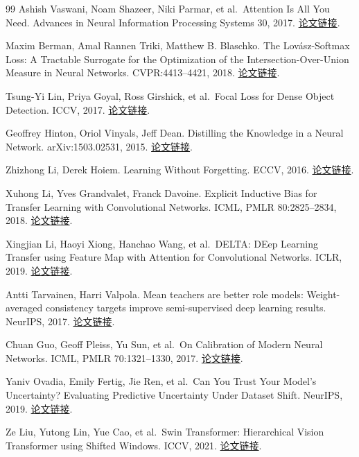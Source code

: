\documentclass[UTF8,a4paper,zihao=-4,fontset=none]{ctexart}
\begin{document}
\begin{thebibliography}{99}
Ashish Vaswani, Noam Shazeer, Niki Parmar, et al.~Attention Is All You Need. Advances in Neural Information Processing Systems 30, 2017. \href{https://papers.nips.cc/paper/7181-attention-is-all-you-need}{论文链接}.

Maxim Berman, Amal Rannen Triki, Matthew B. Blaschko. The Lovász-Softmax Loss: A Tractable Surrogate for the Optimization of the Intersection-Over-Union Measure in Neural Networks. CVPR:4413--4421, 2018. \href{https://arxiv.org/abs/1705.08790}{论文链接}.

Tsung-Yi Lin, Priya Goyal, Ross Girshick, et al.~Focal Loss for Dense Object Detection. ICCV, 2017. \href{https://arxiv.org/abs/1708.02002}{论文链接}.

Geoffrey Hinton, Oriol Vinyals, Jeff Dean. Distilling the Knowledge in a Neural Network. arXiv:1503.02531, 2015. \href{https://arxiv.org/abs/1503.02531}{论文链接}.

Zhizhong Li, Derek Hoiem. Learning Without Forgetting. ECCV, 2016. \href{https://arxiv.org/abs/1606.09282}{论文链接}.

Xuhong Li, Yves Grandvalet, Franck Davoine. Explicit Inductive Bias for Transfer Learning with Convolutional Networks. ICML, PMLR 80:2825--2834, 2018. \href{https://proceedings.mlr.press/v80/li18a.html}{论文链接}.

Xingjian Li, Haoyi Xiong, Hanchao Wang, et al.~DELTA: DEep Learning Transfer using Feature Map with Attention for Convolutional Networks. ICLR, 2019. \href{https://openreview.net/forum?id=rkgbwsAcYm}{论文链接}.

Antti Tarvainen, Harri Valpola. Mean teachers are better role models: Weight-averaged consistency targets improve semi-supervised deep learning results. NeurIPS, 2017. \href{https://arxiv.org/abs/1703.01780}{论文链接}.

Chuan Guo, Geoff Pleiss, Yu Sun, et al.~On Calibration of Modern Neural Networks. ICML, PMLR 70:1321--1330, 2017. \href{https://proceedings.mlr.press/v70/guo17a.html}{论文链接}.

Yaniv Ovadia, Emily Fertig, Jie Ren, et al.~Can You Trust Your Model's Uncertainty? Evaluating Predictive Uncertainty Under Dataset Shift. NeurIPS, 2019. \href{https://arxiv.org/abs/1906.02530}{论文链接}.

Ze Liu, Yutong Lin, Yue Cao, et al.~Swin Transformer: Hierarchical Vision Transformer using Shifted Windows. ICCV, 2021. \href{https://arxiv.org/abs/2103.14030}{论文链接}.


\end{thebibliography}
\end{document}
